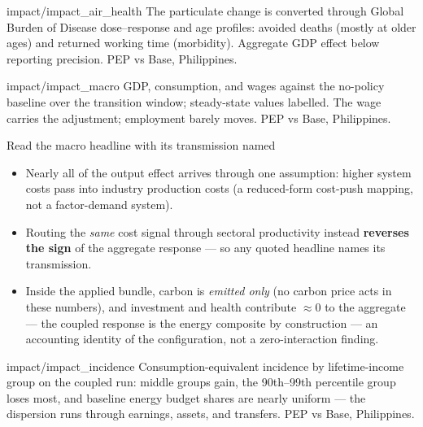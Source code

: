 %
  {impact/impact_air_health}%
  {The particulate change is converted through Global Burden of Disease
   dose--response and age profiles: avoided deaths (mostly at older ages) and
   returned working time (morbidity). Aggregate GDP effect below reporting
   precision. PEP vs Base, Philippines.}

%
  {impact/impact_macro}%
  {GDP, consumption, and wages against the no-policy baseline over the
   transition window; steady-state values labelled. The wage carries the
   adjustment; employment barely moves. PEP vs Base, Philippines.}

\begin{frame}{Read the macro headline with its transmission named}
  \begin{itemize}\setlength\itemsep{8pt}
    \item Nearly all of the output effect arrives through one assumption:
          higher system costs pass into industry production costs
          (a reduced-form cost-push mapping, not a factor-demand system).
    \item Routing the \emph{same} cost signal through sectoral productivity
          instead \textbf{reverses the sign} of the aggregate response
          --- so any quoted headline names its transmission.
    \item Inside the applied bundle, carbon is \emph{emitted only} (no carbon
          price acts in these numbers), and investment and health contribute
          $\approx 0$ to the aggregate --- the coupled response is the energy
          composite by construction --- an accounting identity of the
          configuration, not a zero-interaction finding.
  \end{itemize}
\end{frame}

%
  {impact/impact_incidence}%
  {Consumption-equivalent incidence by lifetime-income group on the coupled
   run: middle groups gain, the 90th--99th percentile group loses most, and
   baseline energy budget shares are nearly uniform --- the dispersion runs
   through earnings, assets, and transfers. PEP vs Base, Philippines.}
